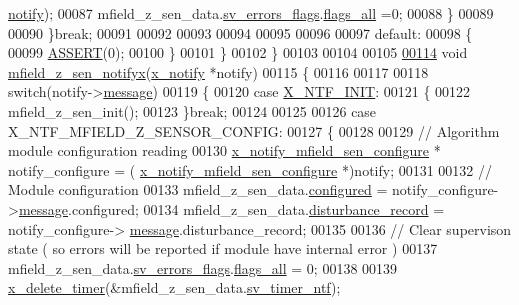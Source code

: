 \begin{DoxyCode}
      \hyperlink{a00019_a8e6a04c2283f9fd7b8dcbc62faba5847}{notify});
00087              mfield\_z\_sen\_data.\hyperlink{a00027_aaeec6b0609dba31393f337abf1cce3d3}{sv\_errors\_flags}.\hyperlink{a00022_a1caa87b00c878186140c3bac9c8acf3b}{flags\_all} =0;
00088             \}
00089 
00090         \}\textcolor{keywordflow}{break};
00091 
00092 
00093 
00094 
00095 
00096 
00097         \textcolor{keywordflow}{default}:
00098         \{
00099             \hyperlink{a00072_abb8ff8e213ac9f6fb21d2b968583b936}{ASSERT}(0);
00100         \}
00101     \}
00102 \}
00103 
00104 
00105 
\hypertarget{a00053_source_l00114}{}\hyperlink{a00053_a2008fa1563c740e4f6c7e1179675f1f7}{00114} \textcolor{keywordtype}{void} \hyperlink{a00053_a2008fa1563c740e4f6c7e1179675f1f7}{mfield\_z\_sen\_notifyx}(\hyperlink{a00036_df/d4c/a00851}{x\_notify} *notify)
00115 \{
00116 
00117 
00118     \textcolor{keywordflow}{switch}(notify->\hyperlink{a00036_adf9665938515a20c283eea2c978cf80d}{message})
00119     \{
00120         \textcolor{keywordflow}{case} \hyperlink{a00036_a620b808f2d7b8d2a03c4d026a4c5423c}{X\_NTF\_INIT}:
00121         \{
00122             mfield\_z\_sen\_init();
00123         \}\textcolor{keywordflow}{break};
00124 
00125 
00126         \textcolor{keywordflow}{case} X\_NTF\_MFIELD\_Z\_SENSOR\_CONFIG:
00127         \{
00128 
00129               \textcolor{comment}{// Algorithm module configuration reading}
00130               \hyperlink{a00019_d2/d5e/a00860}{x\_notify\_mfield\_sen\_configure} * notify\_configure = (
      \hyperlink{a00019_d2/d5e/a00860}{x\_notify\_mfield\_sen\_configure} *)notify;
00131 
00132               \textcolor{comment}{// Module configuration}
00133               mfield\_z\_sen\_data.\hyperlink{a00027_a94b2d1f6ea4ab334c74d24984dd27843}{configured} = notify\_configure->\hyperlink{a00019_ae926905663cb8ca01f1bc2d670e428f5}{message}.configured;
00134               mfield\_z\_sen\_data.\hyperlink{a00027_ac9b38e2c1d3f1013a88d33506c754152}{disturbance\_record} = notify\_configure->
      \hyperlink{a00019_ae926905663cb8ca01f1bc2d670e428f5}{message}.disturbance\_record;
00135 
00136               \textcolor{comment}{// Clear supervison state ( so errors will be reported if module have internal error )}
00137               mfield\_z\_sen\_data.\hyperlink{a00027_aaeec6b0609dba31393f337abf1cce3d3}{sv\_errors\_flags}.\hyperlink{a00022_a1caa87b00c878186140c3bac9c8acf3b}{flags\_all} = 0;
00138 
00139               \hyperlink{a00036_ab69e9af4cfa717e870d587906283635c}{x\_delete\_timer}(&mfield\_z\_sen\_data.\hyperlink{a00027_ada91b200053f2d93e3639dc4ee3415b4}{sv\_timer\_ntf});

\end{DoxyCode}
